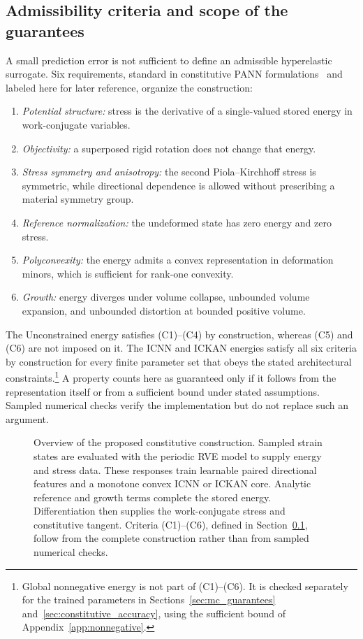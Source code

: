 \subsection{Admissibility criteria and scope of the guarantees}
\label{sec:requirements}
A small prediction error is not sufficient to define an admissible hyperelastic surrogate. Six requirements, standard in constitutive PANN formulations~\cite{klein2022,linden2023} and labeled here for later reference, organize the construction:
\begin{enumerate}
 \item[(C1)] \emph{Potential structure:} stress is the derivative of a single-valued stored energy in work-conjugate variables.
 \item[(C2)] \emph{Objectivity:} a superposed rigid rotation does not change that energy.
 \item[(C3)] \emph{Stress symmetry and anisotropy:} the second Piola--Kirchhoff stress is symmetric, while directional dependence is allowed without prescribing a material symmetry group.
 \item[(C4)] \emph{Reference normalization:} the undeformed state has zero energy and zero stress.
 \item[(C5)] \emph{Polyconvexity:} the energy admits a convex representation in deformation minors, which is sufficient for rank-one convexity.
 \item[(C6)] \emph{Growth:} energy diverges under volume collapse, unbounded volume expansion, and unbounded distortion at bounded positive volume.
\end{enumerate}
The Unconstrained energy satisfies (C1)--(C4) by construction, whereas (C5) and (C6) are not imposed on it. The ICNN and ICKAN energies satisfy all six criteria by construction for every finite parameter set that obeys the stated architectural constraints.\footnote{Global nonnegative energy is not part of (C1)--(C6). It is checked separately for the trained parameters in Sections~\ref{sec:mc_guarantees} and~\ref{sec:constitutive_accuracy}, using the sufficient bound of Appendix~\ref{app:nonnegative}.} A property counts here as guaranteed only if it follows from the representation itself or from a sufficient bound under stated assumptions. Sampled numerical checks verify the implementation but do not replace such an argument.

\begin{figure}[p]
 \centering
 \caption{Overview of the proposed constitutive construction. Sampled strain states are evaluated with the periodic RVE model to supply energy and stress data. These responses train learnable paired directional features and a monotone convex ICNN or ICKAN core. Analytic reference and growth terms complete the stored energy. Differentiation then supplies the work-conjugate stress and constitutive tangent. Criteria (C1)--(C6), defined in Section~\ref{sec:requirements}, follow from the complete construction rather than from sampled numerical checks.}
 \label{fig:constitutive_pipeline}
\end{figure}

